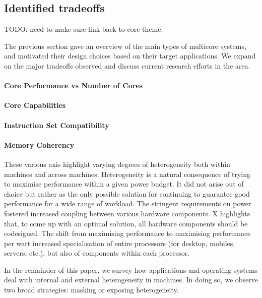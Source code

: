 \subsection{Identified tradeoffs}
TODO: need to make sure link back to core theme. 

The previous section gave an overview of the main types of multicore systems, 
and motivated their design choices based on their target applications. 
We expand on the major tradeoffs observed and discuss current research efforts in the area. 
\paragraph{Core Performance vs Number of Cores}
\paragraph{Core Capabilities}
\paragraph{Instruction Set Compatibility }
\paragraph{Memory Coherency}

These various axis highlight varying degrees of heterogeneity both within
machines and across machines. Heterogeneity is a natural consequence of 
trying to maximise performance within a given power budget. It did not arise
out of choice but rather as the only possible solution for continuing to guarantee
good performance for a wide range of workload. The stringent requirements
on power fostered increased coupling between various hardware components.
X  highlights that, to come up with an optimal solution, all hardware components
should be codesigned. The shift from maximising performance to maximising performance
per watt increased specialisation of entire processors (for desktop, mobiles,
servers, etc.), but also of components within each processor. 

In the remainder of this paper, we survey how applications and operating
systems deal with internal and external heterogeneity in machines. 
In doing so, we observe two broad strategies: masking or exposing heterogeneity. 

